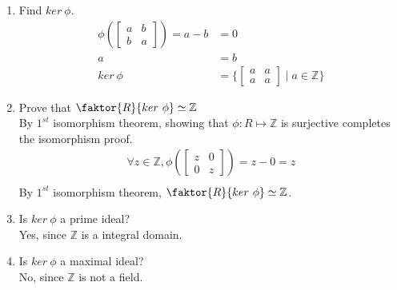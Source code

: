 \documentclass[12pt]{article}
\begin{document}
\begin{enumerate}
\begin{enumerate}
			\item Find $ker\ \phi$.
				\begin{align*}
					\phi\left(\begin{bmatrix} a & b\\ b & a \end{bmatrix}\right) = a-b &= 0\\
					a &= b\\
					ker\ \phi &= \bigg\{\begin{bmatrix} a & a\\ a & a \end{bmatrix} \mid
					a \in \mathbb{Z}\bigg\}
				\end{align*}

			\item Prove that $\faktor{R}{ker\ \phi} \simeq \mathbb{Z}$\\
				By $1^{st}$ isomorphism theorem, showing that $\phi: R \mapsto
				\mathbb{Z}$ is surjective completes the isomorphism proof.
				\begin{align*}
					\forall z \in \mathbb{Z}, \phi\left(\begin{bmatrix} z & 0\\ 0 & z
					\end{bmatrix}\right) = z-0 = z\\
				\end{align*}
				By $1^{st}$ isomorphism theorem, $\faktor{R}{ker\ \phi} \simeq
				\mathbb{Z}$.

			\item Is $ker\ \phi$ a prime ideal?\\
				Yes, since $\mathbb{Z}$ is a integral domain.
			\item Is $ker\ \phi$ a maximal ideal?\\
				No, since $\mathbb{Z}$ is not a field.
		\end{enumerate}


\end{enumerate}
\end{document}
